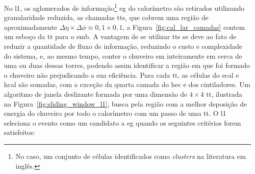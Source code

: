No \gls{l1}, os aglomerados de informação\footnote{No caso, um conjunto de
células identificados como \emph{clusters} na literatura em inglês.} \gls{eg} do calorímetro são retirados
utilizando granularidade reduzida, as chamadas \glspl{tt}, que cobrem uma região
de aproximadamente $\Delta\eta\times\Delta\phi\approx0,1\times0,1$, 
a Figura~\ref{fig:cal_lar_camadas} contem um esboço da \gls{tt} para o
\gls{emb}. A vantagem de se utilizar \glspl{tt} se deve ao
fato de reduzir a quantidade de fluxo de informação, reduzindo o custo e
complexidade do sistema, e, ao mesmo tempo, conter o chuveiro \gls{em} inteiramente 
em cerca de uma ou duas dessas torres, podendo
assim identificar a região em que foi formado o chuveiro não prejudicando a sua
eficiência. Para cada \gls{tt}, as células do \gls{ecal} e \gls{hcal} são somadas, com a
exceção da quarta camada do \gls{hec} e dos cintiladores.
Um algoritmo de janela deslizante formada por uma dimensão de $4\times4$
\gls{tt}, ilustrada na Figura~\ref{fig:sliding_window_l1}, 
busca pela região com a melhor deposição de energia do chuveiro por
todo o calorímetro com um passo de uma \gls{tt}.
O \gls{l1} seleciona o evento como um candidato a \gls{eg} 
quando os seguintes critérios forem satisfeitos:

